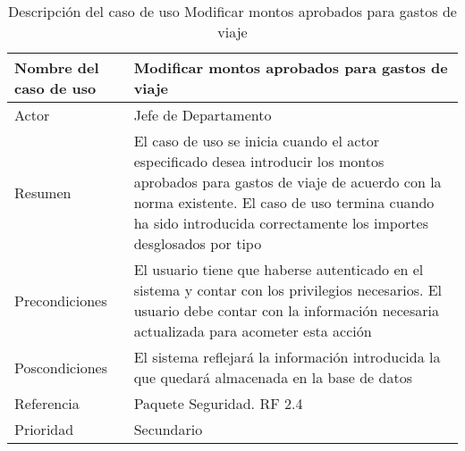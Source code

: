 \begin{table}[H]
	\sf
	\begin{supertabular}{|p{4.5cm}|p{12cm}|}
		\hline
		\textbf{Nombre del caso de uso}
		& \textbf{Modificar montos aprobados para gastos de viaje} \\ \hline
		
		Actor
		& Jefe de Departamento \\ \hline
		
		Resumen
		& El caso de uso se inicia cuando el actor especificado desea introducir los montos aprobados para gastos de viaje de acuerdo con la norma existente. El caso de uso termina cuando ha sido introducida correctamente los importes desglosados por tipo \\ \hline
		
		Precondiciones
		& El usuario tiene que haberse autenticado en el sistema y contar con los privilegios necesarios. El usuario debe contar con la información necesaria actualizada para acometer esta acción \\ \hline
		
		Poscondiciones
		& El sistema reflejará la información introducida la que quedará almacenada en la base de datos \\ \hline
		
		Referencia
		& Paquete Seguridad. RF 2.4 \\ \hline
		
		Prioridad
		& Secundario \\		
		\hline
	\end{supertabular}
	\caption[Descripción del caso de uso Modificar montos aprobados para gastos de viaje]{Descripción del caso de uso Modificar montos aprobados para gastos de viaje}
	\label{table:CU_ModMontos}
\end{table}

